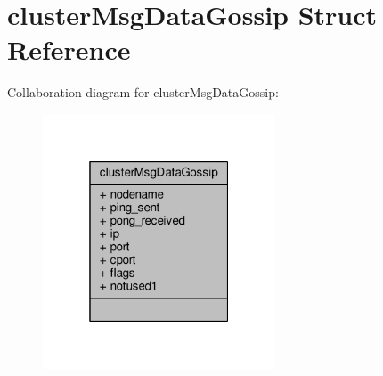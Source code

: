 \hypertarget{structclusterMsgDataGossip}{}\section{cluster\+Msg\+Data\+Gossip Struct Reference}
\label{structclusterMsgDataGossip}


Collaboration diagram for cluster\+Msg\+Data\+Gossip\+:\nopagebreak
\begin{figure}[H]
\begin{center}
\leavevmode
\includegraphics[width=196pt]{structclusterMsgDataGossip__coll__graph}
\end{center}
\end{figure}
